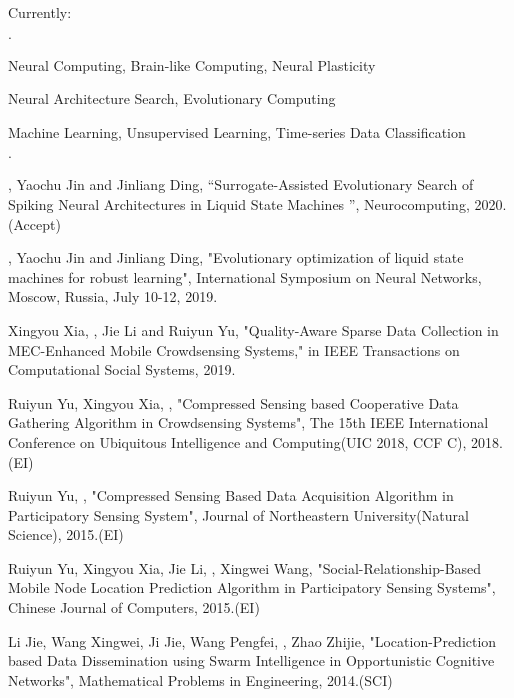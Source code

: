 \documentclass{joel_cv}
\begin{document}
\begin{cvHeader}
\end{cvHeader}


%
%

Currently:
\begin{sectionItemize}{$\cdot$}
	\item Neural Computing, Brain-like Computing, Neural Plasticity
    \item Neural Architecture Search, Evolutionary Computing
    \item Machine Learning, Unsupervised Learning, Time-series Data Classification
\end{sectionItemize}

%
%

\begin{sectionItemize}{$\cdot$}
	\item {}, Yaochu Jin and Jinliang Ding, “Surrogate-Assisted Evolutionary Search of Spiking Neural Architectures in Liquid State Machines ”, Neurocomputing, 2020.(Accept)
    \item {}, Yaochu Jin and Jinliang Ding, "Evolutionary optimization of liquid state machines for robust learning", International Symposium on Neural Networks, Moscow, Russia, July 10-12, 2019.
    \item Xingyou Xia, , Jie Li and Ruiyun Yu, "Quality-Aware Sparse Data Collection in MEC-Enhanced Mobile Crowdsensing Systems," in IEEE Transactions on Computational Social Systems, 2019.
    \item Ruiyun Yu, Xingyou Xia, , "Compressed Sensing based Cooperative Data Gathering Algorithm in Crowdsensing Systems", The 15th IEEE International Conference on Ubiquitous Intelligence and Computing(UIC 2018, CCF C), 2018.(EI)
	\item Ruiyun Yu, , "Compressed Sensing Based Data Acquisition Algorithm in Participatory Sensing System", Journal of Northeastern University(Natural Science), 2015.(EI)
	\item Ruiyun Yu, Xingyou Xia, Jie Li, , Xingwei Wang, "Social-Relationship-Based Mobile Node Location Prediction Algorithm in Participatory Sensing Systems", Chinese Journal of Computers, 2015.(EI)
    \item Li Jie, Wang Xingwei, Ji Jie, Wang Pengfei, , Zhao Zhijie, "Location-Prediction based Data Dissemination using Swarm Intelligence in Opportunistic Cognitive Networks", Mathematical Problems in Engineering, 2014.(SCI)
\end{sectionItemize}
\end{document}
